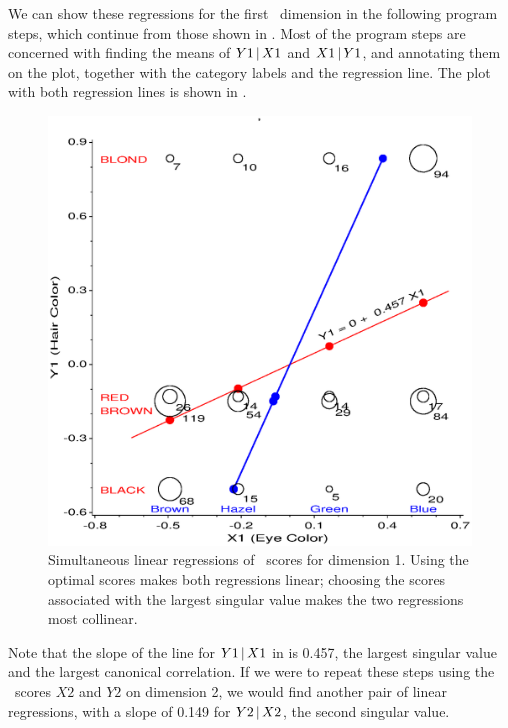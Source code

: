 We can show these regressions for the first \CA\ dimension
in the following program steps, which continue from those
shown in .
Most of the program steps are concerned with finding the means
of $Y1\, | \, X1$ and $X1\, | \, Y1$, and annotating them on the
plot, together with the category labels and the regression line.
The plot with both regression lines is shown in .
\begin{figure}[htb]
  \centering
  \includegraphics[scale=.6,clip]{ch5/fig/cascores}
  \caption[Simultaneous linear regressions of \CA\ scores for dimension 1]{Simultaneous linear regressions of \CA\ scores for dimension 1.  Using the optimal scores makes both regressions linear; choosing the scores associated with the largest singular value makes the two regressions most collinear.}\label{fig:cascores}
\end{figure}

Note that the slope of the line for $Y1\, | \, X1$ in  is 0.457, the largest singular value and the largest canonical correlation.
If we were to repeat these steps using the \CA\ scores $X2$ and $Y2$
on dimension 2, we would find another pair of linear regressions, with
a slope of 0.149 for $Y2\, | \, X2$, the second singular value.
